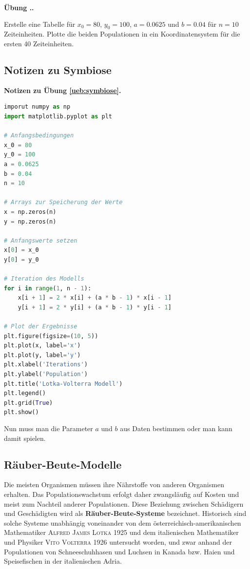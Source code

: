 \documentclass[%
11pt,%
twoside,%
titlepage,%
german,%
headsepline%
]{scrartcl}
\newcommand{\faEyeLightGray}{\textcolor{lightgray}{\faEye}} %
\newcommand{\concatueb}[1]{ueb:#1}%
\newcommand{\concatlsg}[1]{lsg:#1}%
\newcounter{uebcounter}[section]
\renewcommand{\theuebcounter}{\thesection.\arabic{uebcounter}}  %
\newenvironment{lsg}[1]{%
    \par\noindent\textbf{Notizen zu Übung \ref{\concatueb{#1}}.}%
    \label{\concatlsg{#1}}
}{%
    \par%
}
\newenvironment{uebenv}[1]{%
    \refstepcounter{uebcounter}
    \par\noindent\textbf{Übung \theuebcounter.}%
    \label{\concatueb{#1}}\hfill\hyperref[\concatlsg{#1}]{\faEyeLightGray}\par
}{%
    \par
}
\begin{document}
\begin{uebenv}{symbiose}
Erstelle eine Tabelle für $x_0=80$, $y_0=100$, $a=0.0625$ und $b=0.04$ für $n=10$ Zeiteinheiten. Plotte die beiden Populationen in ein Koordinatensystem für die ersten 40 Zeiteinheiten.
\end{uebenv}

\subsection{Notizen zu Symbiose}

\begin{lsg}{symbiose}
    \begin{lstlisting}[language=python]
imporut numpy as np
import matplotlib.pyplot as plt

# Anfangsbedingungen
x_0 = 80
y_0 = 100
a = 0.0625
b = 0.04
n = 10

# Arrays zur Speicherung der Werte
x = np.zeros(n)
y = np.zeros(n)

# Anfangswerte setzen
x[0] = x_0
y[0] = y_0

# Iteration des Modells
for i in range(1, n - 1):
    x[i + 1] = 2 * x[i] + (a * b - 1) * x[i - 1]
    y[i + 1] = 2 * y[i] + (a * b - 1) * y[i - 1]

# Plot der Ergebnisse
plt.figure(figsize=(10, 5))
plt.plot(x, label='x')
plt.plot(y, label='y')
plt.xlabel('Iterations')
plt.ylabel('Population')
plt.title('Lotka-Volterra Modell')
plt.legend()
plt.grid(True)
plt.show()

    \end{lstlisting}

    Nun muss man die Parameter $a$ und $b$ aus Daten bestimmen oder man kann damit spielen.
\end{lsg}

\clearpage

\subsection{Räuber-Beute-Modelle}

Die meisten Organismen müssen ihre Nährstoffe von anderen Organismen erhalten. Das Populationswachstum erfolgt daher zwangsläufig auf Kosten und meist zum Nachteil anderer Populationen. Diese Beziehung zwischen Schädigern und Geschädigten wird als \textbf{Räuber-Beute-Systeme} bezeichnet. Historisch sind solche Systeme unabhängig voneinander von dem österreichisch-amerikanischen Mathematiker \textsc{Alfred James Lotka} 1925 und dem italienischen
Mathematiker und Physiker \textsc{Vito Volterra} 1926 untersucht worden, und zwar anhand der Populationen von Schneeschuhhasen und Luchsen in Kanada bzw. Haien und Speisefischen in der italienischen Adria.
\end{document}
